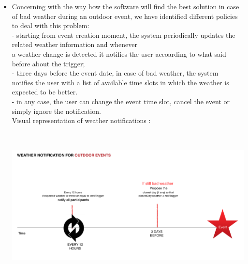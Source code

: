 \documentclass[12pt]{book}
\begin{document}
\begin{itemize}
	\item Concerning with the way how the software will find the best solution in case of bad weather during an outdoor event, we have identified different policies to deal with this problem: \\ 
		        - starting from event creation moment, the system periodically updates the related weather information and whenever\\ a weather change is detected it notifies the user accoarding to what said before about the trigger; \\
			- three days before the event date, in case of bad weather, the system\\ notifies the user with a list of available time slots in which the weather is expected to be better.\\
			- in any case, the user can change the event time slot, cancel the event or simply ignore the notification.\\
	Visual representation of weather notifications : 
	\begin{center}
		\includegraphics[width=16cm,height=8cm]{time}
	\end{center}
	

\end{itemize}
\end{document}
